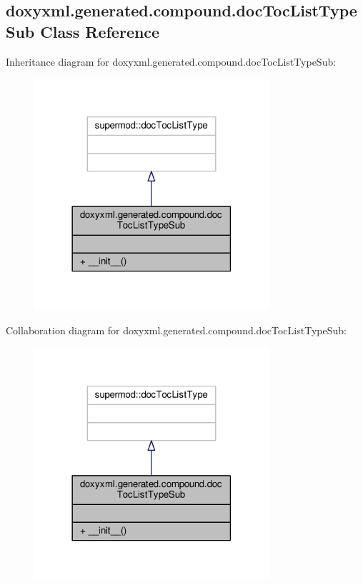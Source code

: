 \subsection{doxyxml.\+generated.\+compound.\+doc\+Toc\+List\+Type\+Sub Class Reference}
\label{classdoxyxml_1_1generated_1_1compound_1_1docTocListTypeSub}


Inheritance diagram for doxyxml.\+generated.\+compound.\+doc\+Toc\+List\+Type\+Sub\+:
\nopagebreak
\begin{figure}[H]
\begin{center}
\leavevmode
\includegraphics[width=246pt]{db/de9/classdoxyxml_1_1generated_1_1compound_1_1docTocListTypeSub__inherit__graph}
\end{center}
\end{figure}


Collaboration diagram for doxyxml.\+generated.\+compound.\+doc\+Toc\+List\+Type\+Sub\+:
\nopagebreak
\begin{figure}[H]
\begin{center}
\leavevmode
\includegraphics[width=246pt]{dc/daf/classdoxyxml_1_1generated_1_1compound_1_1docTocListTypeSub__coll__graph}
\end{center}
\end{figure}
